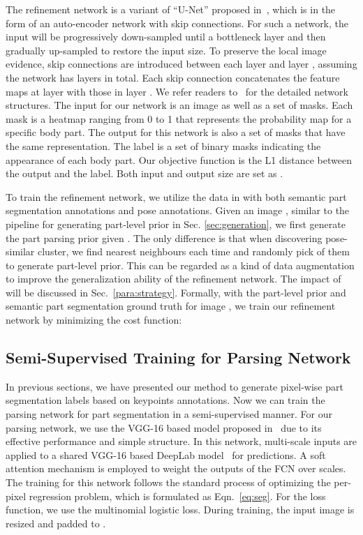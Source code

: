 \documentclass[10pt,twocolumn,letterpaper]{article}
\begin{document}
The refinement network is a variant of ``U-Net'' proposed in~\cite{pix2pix2016}, which is in the form of an auto-encoder network with skip connections. For such a network, the input will be progressively down-sampled until a bottleneck layer and then gradually up-sampled to restore the input size. To preserve the local image evidence, skip connections are introduced between each layer  and layer , assuming the network has  layers in total. Each skip connection concatenates the feature maps at layer  with those in layer . We refer readers to~\cite{pix2pix2016} for the detailed network structures. The input for our network is an image as well as a set of masks. Each mask is a heatmap ranging from 0 to 1 that represents the probability map for a specific body part. The output for this network is also a set of masks that have the same representation. The label is a set of binary masks indicating the appearance of each body part. Our objective function is the L1 distance between the output and the label. Both input and output size are set as .

To train the refinement network, we utilize the data in   with both semantic part segmentation annotations and pose annotations. Given an image , similar to the pipeline for generating part-level prior in Sec. \ref{sec:generation}, we first generate the part parsing prior  given . The only difference is that when discovering pose-similar cluster, we find  nearest neighbours each time and randomly pick  of them to generate part-level prior. This can be regarded as a kind of data augmentation to improve the generalization ability of the refinement network. The impact of  will be discussed in Sec.~\ref{para:strategy}. Formally, with the part-level prior  and semantic part segmentation ground truth  for image , we train our refinement network by minimizing the cost function:


\subsection{Semi-Supervised Training for Parsing Network}
\vspace{-2mm}
\label{sec:semi}
In previous sections, we have presented our method to generate pixel-wise part segmentation labels based on keypoints annotations. Now we can train the parsing network for part segmentation in a semi-supervised manner. For our parsing network, we use the VGG-16 based model proposed in~\cite{chen2016attention} due to its effective performance and simple structure. In this network, multi-scale inputs are applied to a shared VGG-16 based DeepLab model~\cite{chen2015deeplab} for predictions. A soft attention mechanism is employed to weight the outputs of the FCN over scales. The training for this network follows the standard process of optimizing the per-pixel regression problem, which is formulated as Eqn.~\ref{eq:seg}. For the loss function, we use the multinomial logistic loss. During training, the input image is resized and padded to .
\end{document}
